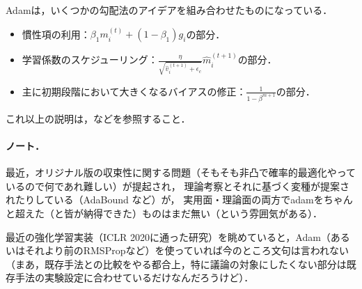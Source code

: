 Adamは，いくつかの勾配法のアイデアを組み合わせたものになっている．
\begin{itemize}
\item 慣性項の利用：$\beta_1m_i^{(t)} + (1-\beta_1)g_i$の部分．
\item 学習係数のスケジューリング：$\frac{\eta}{\sqrt{\hat{v}_i^{(t+1)}+\epsilon_c}}\hat{m}_i^{(t+1)}$の部分．
\item 主に初期段階において大きくなるバイアスの修正：$\frac{1}{1-\beta^{m+1}}$の部分．
\end{itemize}
これ以上の説明は，\cite{ruder2016overview}などを参照すること．


\paragraph{ノート．}
最近，オリジナル版の収束性に関する問題（そもそも非凸で確率的最適化やっているので何であれ難しい）が提起され\cite{reddi2018convergence}，
理論考察とそれに基づく変種が提案されたりしている（AdaBound \cite{luo2018adaptive}など）が，
実用面・理論面の両方でadamをちゃんと超えた（と皆が納得できた）ものはまだ無い（という雰囲気がある）．


最近の強化学習実装（ICLR 2020に通った研究）を眺めていると，Adam（あるいはそれより前のRMSPropなど）を使っていれば今のところ文句は言われない
（まあ，既存手法との比較をやる都合上，特に議論の対象にしたくない部分は既存手法の実験設定に合わせているだけなんだろうけど）．
